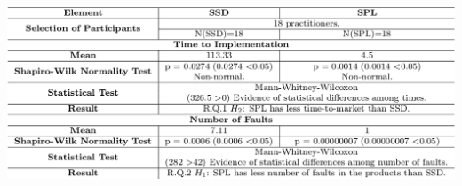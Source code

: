\begin{table}[!ht]
\caption{\label{tab:resul_s}SSD and SPL Normality and Statistical Tests Results.}
\centering
\includegraphics[scale=0.360]{figures/section4/MSPLExpSummary.png}


\end{table}

